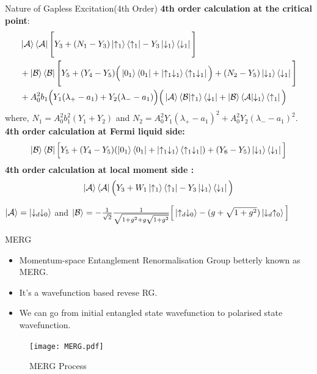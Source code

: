 \documentclass{beamer}
\begin{document}
\begin{frame}{Nature of Gapless Excitation(4th Order)}
\textbf{4th order calculation at the critical point}:
{\small \begin{align*}
& \ket{\mathcal{A}} \bra{\mathcal{A}} \Biggl[ Y_3 + (N_1-Y_3)  \ket{\uparrow_1} \bra{\uparrow_1} -Y_3 \ket{\downarrow_1 } \bra{\downarrow_1 }   \Biggl] \\& + \ket{\mathcal{B}} \bra{\mathcal{B}} \Biggl[ Y_5 + (Y_4 -Y_5)  \Big( \ket{0_1} \bra{0_1} + \ket{\uparrow_1 \downarrow_1} \bra{\uparrow_1 \downarrow_1} \Big)  +( N_2 - Y_5 ) \ket{\downarrow_1} \bra{\downarrow_1} \Biggl] \\& + A_0^2 b_1 \Big( Y_1 (\lambda_+ - a_1) + Y_2 (\lambda_- - a_1) \Big) \Big(\ket{\mathcal{A}} \bra{\mathcal{B}} \ket{\uparrow_1} \bra{\downarrow_1}  + \ket{\mathcal{B}} \bra{\mathcal{A}} \ket{\downarrow_1} \bra{\uparrow_1}\Big) 
\end{align*}}
{\footnotesize where, $N_1 = A_0^2 b_1^2 (Y_1 + Y_2)$ and $N_2 = A_0^2 Y_1 (\lambda_+ - a_1)^2 + A_0^2 Y_2 (\lambda_- - a_1)^2$.}\\

\textbf{4th order calculation at Fermi liquid side:}
\begin{align*}
\ket{\mathcal{B}} \bra{\mathcal{B}} \Big[ Y_5 + (Y_4 - Y_5) (\ket{0_1} \bra{0_1} + \ket{\uparrow_1 \downarrow_1} \bra{\uparrow_1 \downarrow_1} ) + (Y_6 - Y_5) \ket{\downarrow_1} \bra{\downarrow_1} \Big] 
\end{align*}
\textbf{4th order calculation at local moment side :}
\begin{align*}
\ket{\mathcal{A}}\bra{\mathcal{A}} \Big(Y_3 + W_1 \ket{\uparrow_1} \bra{\uparrow_1} -Y_3 \ket{\downarrow_1} \bra{\downarrow_1} \Big) 
\end{align*}

{\footnotesize $\ket{\mathcal{A}} = \ket{\downarrow_d \downarrow_0}$ and $ \ket{\mathcal{B}} = -\frac{1}{\sqrt{2}}\frac{1}{\sqrt{1+ g^2+ g\sqrt{1 + g^2}}} \Big[ \ket{\uparrow_d \downarrow_0} - (g + \sqrt{1 + g^2}) \ket{\downarrow_d \uparrow_0} \Big] $ }


\end{frame}

\begin{frame}{MERG}
\begin{itemize}
\item Momentum-space Entanglement Renormalisation Group betterly known as MERG.
\item It's a wavefunction based revese RG. 
\item We can go from initial entangled state wavefunction to polarised state wavefunction.
\end{itemize}
\begin{figure}[!ht]
    \centering
    \texttt{[image: MERG.pdf]}
    \caption{MERG Process}
    \label{sese}
\end{figure}
\end{frame}

\end{document}
